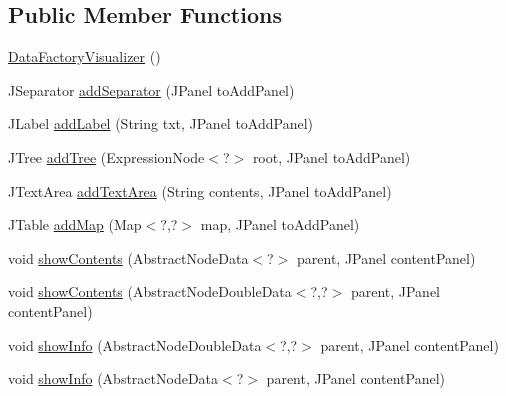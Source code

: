 \subsection*{Public Member Functions}
\begin{DoxyCompactItemize}
\item 
\hyperlink{classit_1_1emarolab_1_1cagg_1_1core_1_1language_1_1syntax_1_1abstractTree_1_1AbstractDataFactory_1_1DataFactoryVisualizer_a0705ee4f99fe03b8b2286c2cb81f14e5}{Data\-Factory\-Visualizer} ()
\item 
J\-Separator \hyperlink{classit_1_1emarolab_1_1cagg_1_1core_1_1language_1_1syntax_1_1abstractTree_1_1AbstractDataFactory_1_1DataFactoryVisualizer_a008a08ae6a5ac1320e64b9a0f5bc1aac}{add\-Separator} (J\-Panel to\-Add\-Panel)
\item 
J\-Label \hyperlink{classit_1_1emarolab_1_1cagg_1_1core_1_1language_1_1syntax_1_1abstractTree_1_1AbstractDataFactory_1_1DataFactoryVisualizer_aa690f840172a07517bcd35ac2a7750ef}{add\-Label} (String txt, J\-Panel to\-Add\-Panel)
\item 
J\-Tree \hyperlink{classit_1_1emarolab_1_1cagg_1_1core_1_1language_1_1syntax_1_1abstractTree_1_1AbstractDataFactory_1_1DataFactoryVisualizer_a00567cb2d89804c8811bd9d89e328824}{add\-Tree} (Expression\-Node$<$?$>$ root, J\-Panel to\-Add\-Panel)
\item 
J\-Text\-Area \hyperlink{classit_1_1emarolab_1_1cagg_1_1core_1_1language_1_1syntax_1_1abstractTree_1_1AbstractDataFactory_1_1DataFactoryVisualizer_a4b591a29eea8cd9b43f902c895725e6d}{add\-Text\-Area} (String contents, J\-Panel to\-Add\-Panel)
\item 
J\-Table \hyperlink{classit_1_1emarolab_1_1cagg_1_1core_1_1language_1_1syntax_1_1abstractTree_1_1AbstractDataFactory_1_1DataFactoryVisualizer_a08ce5b79a92f45c54e94abf8081f76b2}{add\-Map} (Map$<$?,?$>$ map, J\-Panel to\-Add\-Panel)
\item 
void \hyperlink{classit_1_1emarolab_1_1cagg_1_1core_1_1language_1_1syntax_1_1abstractTree_1_1AbstractDataFactory_1_1DataFactoryVisualizer_a0e41cad16ef62a82aeacb66d5a3a8a4a}{show\-Contents} (Abstract\-Node\-Data$<$?$>$ parent, J\-Panel content\-Panel)
\item 
void \hyperlink{classit_1_1emarolab_1_1cagg_1_1core_1_1language_1_1syntax_1_1abstractTree_1_1AbstractDataFactory_1_1DataFactoryVisualizer_ae2b22ac68cd928fcd34ee6566d1d15c5}{show\-Contents} (Abstract\-Node\-Double\-Data$<$?,?$>$ parent, J\-Panel content\-Panel)
\item 
void \hyperlink{classit_1_1emarolab_1_1cagg_1_1core_1_1language_1_1syntax_1_1abstractTree_1_1AbstractDataFactory_1_1DataFactoryVisualizer_a90046cf210b24c71141a753129348453}{show\-Info} (Abstract\-Node\-Double\-Data$<$?,?$>$ parent, J\-Panel content\-Panel)
\item 
void \hyperlink{classit_1_1emarolab_1_1cagg_1_1core_1_1language_1_1syntax_1_1abstractTree_1_1AbstractDataFactory_1_1DataFactoryVisualizer_a7d6727fad68d8a35b2d20a9cc5d3ef17}{show\-Info} (Abstract\-Node\-Data$<$?$>$ parent, J\-Panel content\-Panel)
\end{DoxyCompactItemize}
